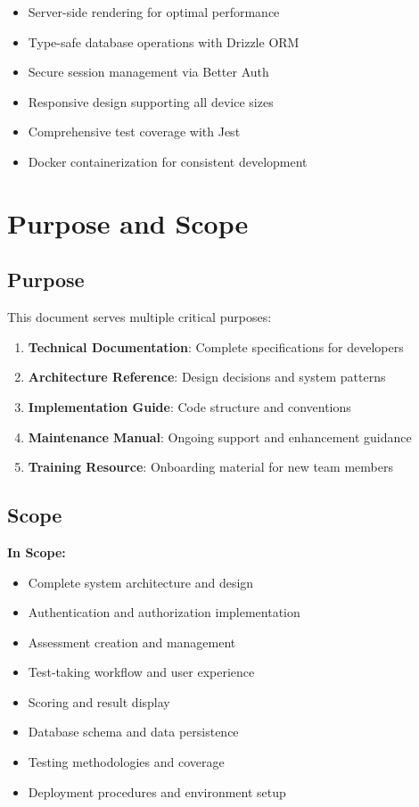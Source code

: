 \documentclass[12pt,a4paper]{report}
\begin{document}
\begin{itemize}
    \item Server-side rendering for optimal performance
    \item Type-safe database operations with Drizzle ORM
    \item Secure session management via Better Auth
    \item Responsive design supporting all device sizes
    \item Comprehensive test coverage with Jest
    \item Docker containerization for consistent development
\end{itemize}

\section{Purpose and Scope}

\subsection{Purpose}

This document serves multiple critical purposes:

\begin{enumerate}
    \item \textbf{Technical Documentation}: Complete specifications for developers
    \item \textbf{Architecture Reference}: Design decisions and system patterns
    \item \textbf{Implementation Guide}: Code structure and conventions
    \item \textbf{Maintenance Manual}: Ongoing support and enhancement guidance
    \item \textbf{Training Resource}: Onboarding material for new team members
\end{enumerate}

\subsection{Scope}

\textbf{In Scope:}
\begin{itemize}
    \item Complete system architecture and design
    \item Authentication and authorization implementation
    \item Assessment creation and management
    \item Test-taking workflow and user experience
    \item Scoring and result display
    \item Database schema and data persistence
    \item Testing methodologies and coverage
    \item Deployment procedures and environment setup
\end{itemize}
\end{document}
